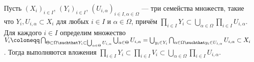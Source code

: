 \documentclass[
	extrafontsizes,
	11pt,
	hyphens,
]{memoir}
\begin{document}
\begin{observation}
\label{obs:TubeLemma}
Пусть \((X_i)_{i \in I}\), \((Y_i)_{i \in I}\), \((U_{i,\alpha})_{i \in I, \alpha \in \Omega}\) --- три семейства множеств, такие что \(Y_i, U_{i,\alpha} \subset X_i\) для любых \(i \in I\) и \(\alpha \in \Omega\), причём \(\prod_{i \in I} Y_i \subset \bigcup_{\alpha \in \Omega} \prod_{i \in I} U_{i,\alpha}\).
Для каждого \(i \in I\) определим множество
\(
V_i \coloneqq
\bigcap_{\Theta \subset \Omega \suchthat Y_i \subset \bigcup_{\alpha \in \Theta} U_{i,\alpha}} \bigcup_{\alpha \in \Theta} U_{i,\alpha}
=
\bigcup_{y_i \in Y_i} \bigcap_{\alpha \in \Omega \suchthat y_i \in U_{i,\alpha}} U_{i,\alpha}
\subset X_i
\).
Тогда
выполняются вложения
\(\prod_{i \in I} Y_i \subset \prod_{i \in I} V_i \subset \bigcup_{\alpha \in \Omega} \prod_{i \in I} U_{i,\alpha}\).
\end{observation}


\end{document}
